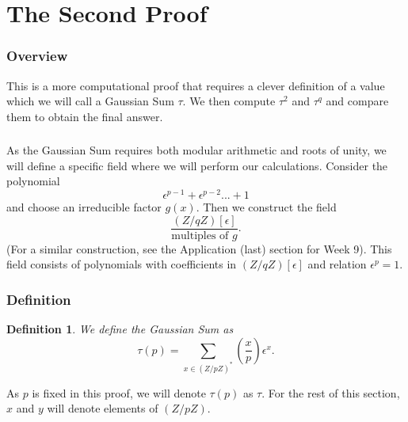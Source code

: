 \documentclass{article}
\newtheorem{definition}{Definition}
\newcommand{\legendre}[2]{\genfrac{(}{)}{}{}{#1}{#2}}
\begin{document}
\section{The Second Proof}
\subsubsection{Overview}
This is a more computational proof that requires a clever definition of a value which we will call a Gaussian Sum $\tau$. We then compute $\tau^{2}$ and $\tau^{q}$ and compare them to obtain the final answer.

\subsubsection{}
As the Gaussian Sum requires both modular arithmetic and roots of unity, we will define a specific field where we will perform our calculations. Consider the polynomial
\begin{equation}
    \epsilon^{p-1} + \epsilon^{p-2} ... + 1
\end{equation}
and choose an irreducible factor $g(x)$. Then we construct the field
\begin{equation}
    \frac{(Z/qZ)[\epsilon]}{\textrm{multiples of }g}.
\end{equation}
(For a similar construction, see the Application (last) section for Week 9). This field consists of polynomials with coefficients in $(Z/qZ)[\epsilon]$ and relation $\epsilon^{p} = 1$.

\subsubsection{Definition}
\begin{definition}
    We define the Gaussian Sum as
    \begin{equation}
    \tau(p) = \sum_{x \in (Z/pZ)^{*}}\legendre{x}{p}\epsilon^{x}.
\end{equation}
\end{definition}
As $p$ is fixed in this proof, we will denote $\tau(p)$ as $\tau$. For the rest of this section, $x$ and $y$ will denote elements of $(Z/pZ)$.
\end{document}
